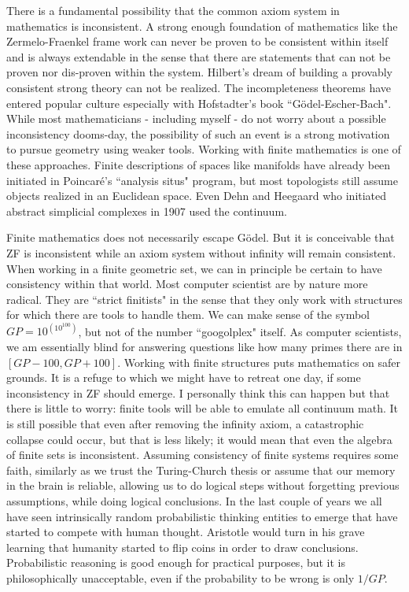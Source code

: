 \documentclass[12pt]{amsart}
\begin{document}
\lettrine[lines=3]{T}{}here is a fundamental possibility that the common axiom system in mathematics
is inconsistent. A strong enough foundation of mathematics like the Zermelo-Fraenkel frame work can never be 
proven to be consistent within itself and is always extendable in the sense that there are statements that can 
not be proven nor dis-proven within the system. Hilbert's dream of building
a provably consistent strong theory can not be realized. The incompleteness theorems have entered popular culture 
especially with Hofstadter's book ``G\"odel-Escher-Bach". While most mathematicians - including myself - do not worry
about a possible inconsistency dooms-day, the possibility of such an event is a strong motivation to pursue 
geometry using weaker tools. Working with finite mathematics is one of these approaches. Finite descriptions of 
spaces like manifolds have already been initiated in Poincar\'e's ``analysis situs" program, but most topologists still
assume objects realized in an Euclidean space.
Even Dehn and Heegaard who initiated abstract simplicial complexes in 1907 used the continuum. 

\hspace{2mm}

\lettrine[lines=1]{F}{}inite mathematics does not necessarily escape G\"odel. But it is conceivable 
that ZF is inconsistent while an axiom system without infinity will remain consistent. 
When working in a finite geometric set, we can in principle be certain to have consistency within that world. 
Most computer scientist are by nature more radical. They are ``strict finitists" in the sense that they only work with
structures for which there are tools to handle them. We can make sense of the symbol $GP = 10^{(10^{100})}$, 
but not of the number ``googolplex" itself. As computer scientists, we am essentially blind for answering questions like 
how many primes there are in $[GP-100,GP+100]$. Working with finite structures puts mathematics on safer grounds. It is a
refuge to which we might have to retreat one day, if some inconsistency in ZF
should emerge. I personally think this can happen but that there is little to worry: finite tools
will be able to emulate all continuum math. It is still possible that even after removing the infinity axiom, 
a catastrophic collapse could occur, but that is less likely; it would mean that even the algebra of finite sets 
is inconsistent. Assuming consistency of finite systems requires some faith, similarly as we trust the
Turing-Church thesis or assume that our memory in the brain is reliable, allowing us to do logical steps
without forgetting previous assumptions, while doing logical conclusions. In the last couple of years we all have seen 
intrinsically random probabilistic thinking entities to emerge that have started to compete with human thought. Aristotle
would turn in his grave learning that humanity started to flip coins in order to draw conclusions. Probabilistic reasoning is good 
enough for practical purposes, but it is philosophically unacceptable, even if the probability to be wrong is only $1/GP$. 
\end{document}
